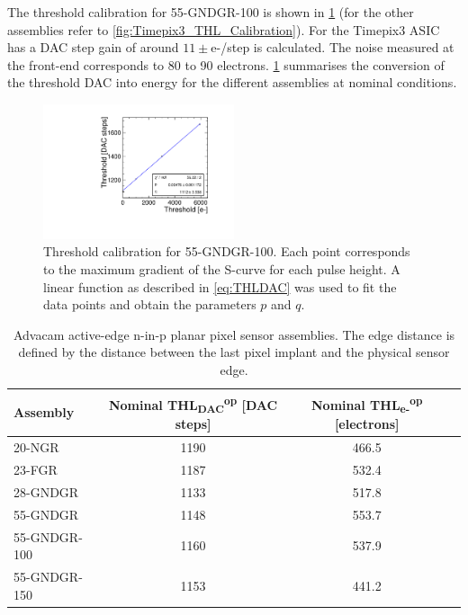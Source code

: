 The threshold calibration for 55-GNDGR-100 is shown in
\cref{fig:THLcalib_55-GNDGR-100} (for the other assemblies refer to
\cref{fig:Timepix3_THL_Calibration}). For the Timepix3 ASIC has a DAC
step gain of around $11\pm$e-/step is calculated. The noise measured
at the front-end corresponds to 80 to 90
electrons. \cref{tab:NominalThreshold} summarises the conversion of
the threshold DAC into energy for the different assemblies at nominal
conditions.

\begin{figure}[htbp]
  \centering
  \includegraphics[width=0.5\textwidth]{./figures/Calibration/THLcalibration_W0005_E02.pdf}
  \caption{Threshold calibration for 55-GNDGR-100. Each point
    corresponds to the maximum gradient of the S-curve for each pulse
    height. A linear function as described in \cref{eq:THLDAC} was
    used to fit the data points and obtain the parameters $p$ and $q$.}
  \label{fig:THLcalib_55-GNDGR-100}
\end{figure}

\begin{table}[htbp]
  \centering
  \caption{Advacam active-edge n-in-p planar pixel sensor assemblies. The edge distance is defined by the distance between the last pixel implant and the physical sensor edge.}
  \label{tab:NominalThreshold}
  \begin{tabular}{lccc}
    \toprule
    Assembly & Nominal THL\textsubscript{DAC}\textsuperscript{op} [DAC steps] & Nominal THL\textsubscript{e-}\textsuperscript{op} [electrons]\\
    \midrule
    20-NGR & 1190 & 466.5\\
    23-FGR & 1187 & 532.4\\ \hline
    28-GNDGR & 1133 & 517.8\\
    55-GNDGR & 1148 & 553.7\\
    55-GNDGR-100 & 1160 & 537.9\\ \hline
    55-GNDGR-150 & 1153 & 441.2\\
    \bottomrule
  \end{tabular}
\end{table}


